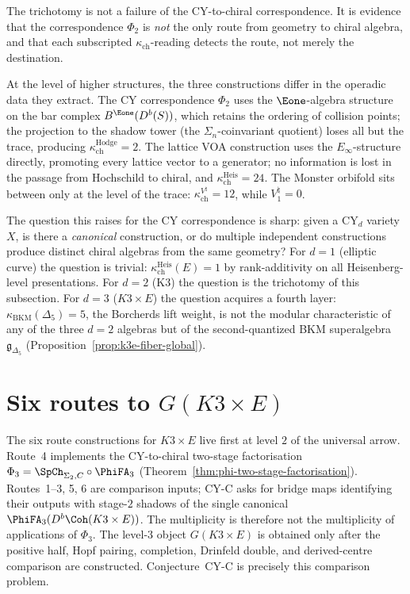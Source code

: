 \begin{remark}
\label{rem:k3-trichotomy-why}
The trichotomy is not a failure of the CY-to-chiral correspondence. It is evidence that
the correspondence $\Phi_2$ is \emph{not} the only route from geometry to chiral algebra,
and that each subscripted \(\kappa_{\mathrm{ch}}\)-reading detects the
route, not merely the destination.

At the level of higher structures, the three constructions differ in the operadic
data they extract. The CY correspondence $\Phi_2$ uses the $\Eone$-algebra structure on the
bar complex $B^{\Eone}(D^b(S))$, which retains the ordering of collision points;
the projection to the shadow tower (the $\Sigma_n$-coinvariant quotient) loses all
but the trace, producing \(\kappa_{\mathrm{ch}}^{\mathrm{Hodge}} = 2\). The lattice VOA
construction uses the $E_\infty$-structure directly, promoting every lattice vector
to a generator; no information is lost in the passage from Hochschild to chiral,
and \(\kappa_{\mathrm{ch}}^{\mathrm{Heis}} = 24\). The Monster orbifold sits
between only at the level of the trace:
\(\kappa_{\mathrm{ch}}^{V^\natural} = 12\), while \(V^\natural_1=0\).

The question this raises for the CY correspondence is sharp: given a CY$_d$
variety $X$, is there a \emph{canonical} construction, or do multiple
independent constructions produce distinct chiral algebras from the
same geometry? For $d = 1$ (elliptic curve) the question is trivial:
$\kappa_{\mathrm{ch}}^{\mathrm{Heis}}(E) = 1$ by rank-additivity on all Heisenberg-level presentations. For $d = 2$ (K3) the question is
the trichotomy of this subsection. For $d = 3$ ($K3 \times E$) the question
acquires a fourth layer: $\kappa_{\mathrm{BKM}}(\Delta_5) = 5$, the Borcherds lift weight,
is not the modular characteristic of any of the three $d = 2$ algebras but of the
second-quantized BKM superalgebra $\mathfrak{g}_{\Delta_5}$ (Proposition~\ref{prop:k3e-fiber-global}).
\end{remark}



\section{Six routes to \texorpdfstring{$G(K3 \times E)$}{G(K3 x E)}}
\label{sec:k3e-six-routes}

The six route constructions for \(K3\times E\) live first at level \(2\)
of the universal arrow. Route~4 implements the CY-to-chiral two-stage factorisation
$\Phi_3 = \SpCh_{\Sigma_2, C} \circ \PhiFA_3$
(Theorem~\ref{thm:phi-two-stage-factorisation}). Routes~1--3, 5, 6 are
comparison inputs; CY-C asks for bridge maps identifying their outputs
with stage-$2$ shadows of the single canonical
\(\PhiFA_3(D^b\Coh(K3 \times E))\). The multiplicity is therefore not
the multiplicity of applications of \(\Phi_3\). The level-$3$ object
\(G(K3 \times E)\) is obtained only after the positive half, Hopf
pairing, completion, Drinfeld double, and derived-centre comparison are
constructed. Conjecture~CY-C is precisely this comparison problem.

